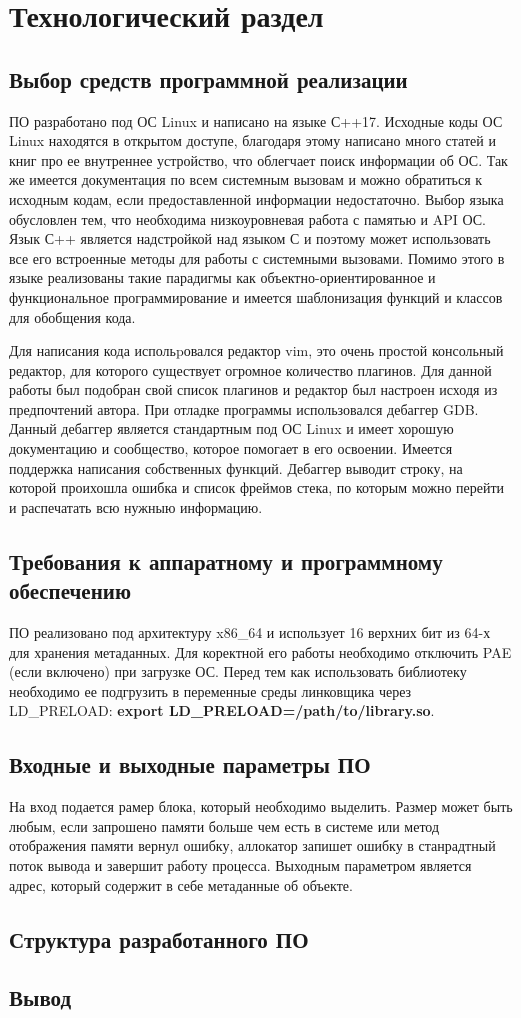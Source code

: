 \chapter{Технологический раздел}
\section{Выбор средств программной реализации}
ПО разработано под ОС Linux и написано на языке С++17. Исходные коды ОС Linux находятся в открытом доступе, благодаря этому написано много статей и книг про ее внутреннее устройство, что облегчает поиск информации об ОС. Так же имеется документация по всем системным вызовам и можно обратиться к исходным кодам, если предоставленной информации недостаточно. Выбор языка обусловлен тем, что необходима низкоуровневая работа с памятью и API ОС. Язык С++ является надстройкой над языком С и поэтому может использовать все его встроенные методы для работы с системными вызовами. Помимо этого в языке реализованы такие парадигмы как объектно-ориентированное и функциональное программирование и имеется шаблонизация функций и классов для обобщения кода.

Для написания кода испольpовался редактор vim, это очень простой консольный редактор, для которого существует огромное количество плагинов. Для данной работы был подобран свой список плагинов и редактор был настроен исходя из предпочтений автора. При отладке программы использовался дебаггер GDB. Данный дебаггер является стандартным под ОС Linux и имеет хорошую документацию и сообщество, которое помогает в его освоении. Имеется поддержка написания собственных функций. Дебаггер выводит строку, на которой проихошла ошибка и список фреймов стека, по которым можно перейти и распечатать всю нужныю информацию.

\section{Требования к аппаратному и программному обеспечению}
ПО реализовано под архитектуру x86\_64 и использует 16 верхних бит из 64-х для хранения метаданных. Для коректной его работы необходимо отключить PAE (если включено) при загрузке ОС. Перед тем как использовать библиотеку необходимо ее подгрузить в переменные среды линковщика через LD\_PRELOAD: \textbf{export LD\_PRELOAD=/path/to/library.so}.

\section{Входные и выходные параметры ПО}
На вход подается рамер блока, который необходимо выделить. Размер может быть любым, если запрошено памяти больше чем есть в системе или метод отображения памяти вернул ошибку, аллокатор запишет ошибку в станрадтный поток вывода и завершит работу процесса. Выходным параметром является адрес, который содержит в себе метаданные об объекте.

\section{Структура разработанного ПО}

\section{Вывод}